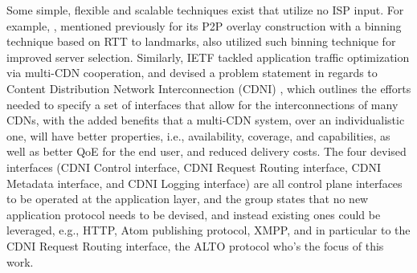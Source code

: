         Some simple, flexible and scalable techniques exist that utilize no ISP input.
        For example, \cite{topology-aware-p2p-server-selection}, mentioned previously for its P2P overlay construction with a binning technique based on RTT to landmarks, also utilized such binning technique for improved server selection.
        Similarly, IETF tackled application traffic optimization via multi-CDN cooperation, and devised a problem statement in regards to Content Distribution Network Interconnection (CDNI) \cite{cdni-problem-statement}, which outlines the efforts needed to specify a set of interfaces that allow for the interconnections of many CDNs, with the added benefits that a multi-CDN system, over an individualistic one, will have better properties, i.e., availability, coverage, and capabilities, as well as better QoE for the end user, and reduced delivery costs.
        The four devised interfaces (CDNI Control interface, CDNI Request Routing interface, CDNI Metadata interface, and CDNI Logging interface) are all control plane interfaces to be operated at the application layer, and the group states that no new application protocol needs to be devised, and instead existing ones could be leveraged, e.g., HTTP, Atom publishing protocol, XMPP, and in particular to the CDNI Request Routing interface, the ALTO protocol who's the focus of this work.

